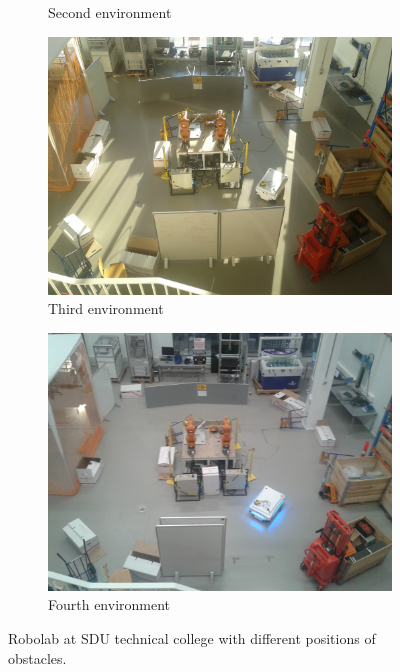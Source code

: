 \begin{figure}[htbp]
\begin{subfigure}[t]{0.499\textwidth}
		\caption{Second environment}
		\label{fig:location_environment2}
	\end{subfigure}
	\begin{subfigure}[t]{0.499\textwidth}
		\centering
		\includegraphics[width=1\textwidth]{chapters/evaluation/figures/mayhem_robolab3}
		\caption{Third environment}
		\label{fig:location_environment3}
	\end{subfigure}
	\begin{subfigure}[t]{0.499\textwidth}
		\centering
		\includegraphics[width=1\textwidth]{chapters/evaluation/figures/mayhem_robolab4}
		\caption{Fourth environment}
		\label{fig:location_environment4}
	\end{subfigure}
	\caption{Robolab at SDU technical college with different positions of obstacles.}
	\label{fig:robolab_mayhem}
\end{figure}

